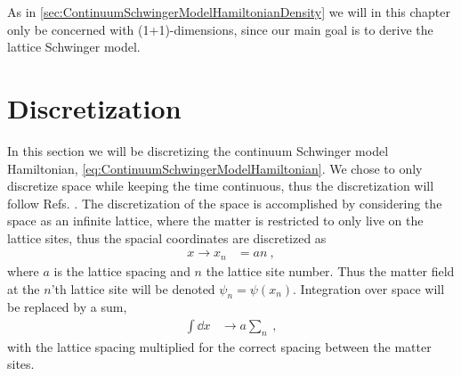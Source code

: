 \documentclass[../main.tex]{subfiles} %
\begin{document}
As in \cref{sec:ContinuumSchwingerModelHamiltonianDensity} we will in this chapter only be concerned with (1+1)-dimensions, since our main goal is to derive the lattice Schwinger model.




\section{Discretization} \label{sec:Discretization}

In this section we will be discretizing the continuum Schwinger model Hamiltonian, \cref{eq:ContinuumSchwingerModelHamiltonian}. We chose to only discretize space while keeping the time continuous, thus the discretization will follow Refs. \cite{sriganish_PhD_LatticeSchwingerModel_2001, smit_introToQuantumFieldsOnALattice_2003}. The discretization of the space is accomplished by considering the space as an infinite lattice, where the matter is restricted to only live on the lattice sites, thus the spacial coordinates are discretized as
\begin{align}
    x \rightarrow x_n &= an \: ,
\end{align}
where $a$ is the lattice spacing and $n$ the lattice site number. Thus the matter field at the $n$'th lattice site will be denoted $\psi_n = \psi(x_n)$. Integration over space will be replaced by a sum,
\begin{align}
    \int \dd{x} &\rightarrow a \sum_n \: ,
\end{align}
with the lattice spacing multiplied for the correct spacing between the matter sites.
\end{document}
